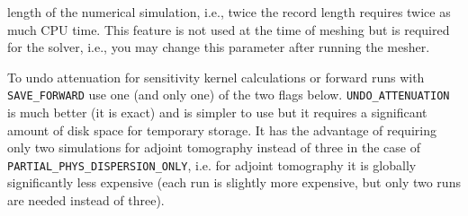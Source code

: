 \begin{description}
length of the numerical simulation, i.e., twice the record length
requires twice as much CPU time. This feature is not used at the time
of meshing but is required for the solver, i.e., you may change this
parameter after running the mesher.
%
\item [{\texttt{PARTIAL\_PHYS\_DISPERSION\_ONLY} or \texttt{UNDO\_ATTENUATION}}] To undo attenuation for sensitivity kernel calculations or forward runs with \texttt{SAVE\_FORWARD}
use one (and only one) of the two flags below. \texttt{UNDO\_ATTENUATION} is much better (it is exact) and is simpler to use
but it requires a significant amount of disk space for temporary storage. It has the advantage of requiring only two simulations for adjoint tomography instead
of three in the case of \texttt{PARTIAL\_PHYS\_DISPERSION\_ONLY}, i.e. for adjoint tomography it is globally significantly less expensive (each run is slightly more
expensive, but only two runs are needed instead of three).\newline


\end{description}
